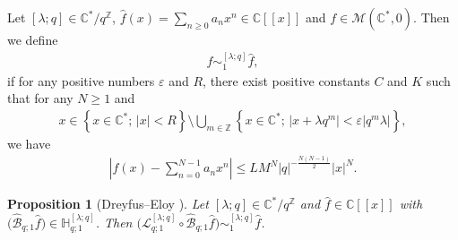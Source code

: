 \documentclass[11pt]{article}
\numberwithin{equation}{section}
\newtheorem{Proposition}[Theorem]{Proposition}
\begin{document}
Let $[\lambda;q]\in\mathbb{C}^*/q^\mathbb{Z}$, $\hat{f}(x)=\sum\limits_{n\ge0}a_nx^n\in\mathbb{C}[[x]]$ and $f\in\mathcal{M}(\mathbb{C}^*,0)$. Then we define
\begin{gather*}
f\sim_1^{[\lambda;q]}\hat{f},
\end{gather*}
if for any positive numbers $\varepsilon$ and $R$, there exist positive constants $C$ and $K$ such that for any $N\ge1$ and
\begin{gather*}
x\in\left\{x\in\mathbb{C}^* ;\,|x|<R\right\}\setminus\bigcup_{m\in\mathbb{Z}}\left\{x\in\mathbb{C}^* ;\,|x+\lambda q^m|<\varepsilon |q^m\lambda |\right\},
\end{gather*}
we have
\begin{gather*}
\left|f(x)-\sum_{n=0}^{N-1}a_nx^n\right|\le LM^N|q|^{-\frac{N(N-1)}{2}}|x|^N.
\end{gather*}
\begin{Proposition}[Dreyfus--Eloy {\cite[Section~1]{DreyfusEloy2016}}]\label{qBorel_AE}
Let $[\lambda;q]\in\mathbb{C}^*/q^\mathbb{Z}$ and $\hat{f}\in\mathbb{C}[[x]]$ with $\big(\hat{\mathcal{B}}_{q;1}\hat{f}\big)\in\mathbb{H}_{q;1}^{[\lambda;q]}$. Then $\big(\mathcal{L}_{q;1}^{[\lambda;q]}\circ\hat{\mathcal{B}}_{q;1}\hat{f}\big)\sim_{1}^{[\lambda;q]}\hat{f}$.
\end{Proposition}
\end{document}
